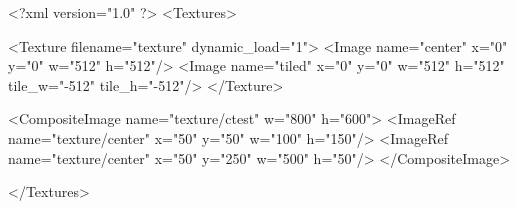 <?xml version="1.0" ?>
<Textures>

	<Texture filename="texture" dynamic_load="1">
		<Image name="center" x="0" y="0" w="512" h="512"/>
		<Image name="tiled" x="0" y="0" w="512" h="512" tile_w="-512" tile_h="-512"/>
	</Texture>
	
	<CompositeImage name="texture/ctest" w="800" h="600">
		<ImageRef name="texture/center" x="50" y="50" w="100" h="150"/>
		<ImageRef name="texture/center" x="50" y="250" w="500" h="50"/>
	</CompositeImage>

</Textures>
